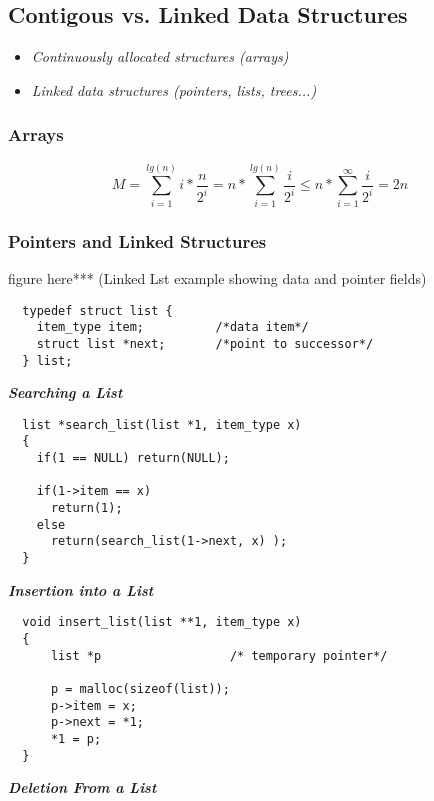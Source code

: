 \subsection{Contigous vs. Linked Data Structures}

\begin{itemize}
	\item 
	  \emph{Continuously allocated structures (arrays)}
	\item 
	  \emph{Linked data structures (pointers, lists, trees...)}
\end{itemize}

\subsubsection{Arrays}
$$M=\sum_{i=1}^{lg(n)} i*\frac{n}{2^{i}} = n*\sum_{i=1}^{lg(n)}\frac{i}{2^{i}} \leq n*\sum_{i=1}^{\infty}\frac{i}{2^{i}} = 2n$$

\subsubsection{Pointers and Linked Structures}

figure here*** (Linked Lst example showing data and pointer fields)

\begin{verbatim}
  typedef struct list {
    item_type item;          /*data item*/
    struct list *next;       /*point to successor*/
  } list;
\end{verbatim}

\textbf{ \emph{Searching a List} }\\

\begin{verbatim}
  list *search_list(list *1, item_type x)
  {
    if(1 == NULL) return(NULL);

    if(1->item == x)
      return(1);
    else
      return(search_list(1->next, x) );
  }
\end{verbatim}

\textbf{ \emph{Insertion into a List} }\\

\begin{verbatim}
  void insert_list(list **1, item_type x) 
  {
      list *p                  /* temporary pointer*/

      p = malloc(sizeof(list));
      p->item = x;
      p->next = *1;
      *1 = p;
  }
\end{verbatim}

\textbf{ \emph{Deletion From a List} }\\

